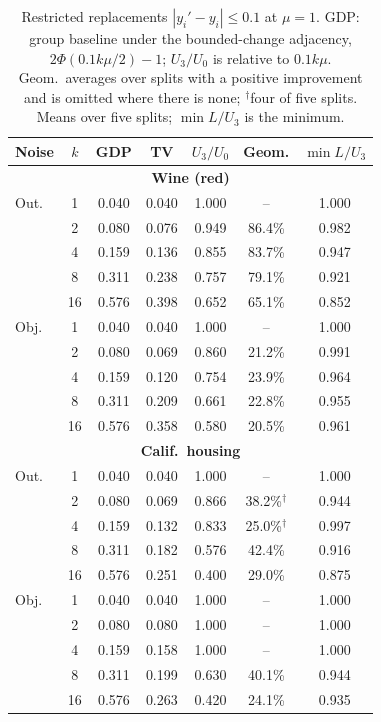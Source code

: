 \begin{table}[t]
\centering
\caption{Restricted replacements $|y_i'-y_i|\le0.1$ at $\mu=1$. GDP: group baseline under the bounded-change adjacency, $2\Phi(0.1k\mu/2)-1$; $U_3/U_0$ is relative to $0.1k\mu$. Geom.\ averages over splits with a positive improvement and is omitted where there is none; $^\dagger$four of five splits. Means over five splits; $\min L/U_3$ is the minimum.}
\label{tab:restricted}
\footnotesize
\setlength{\tabcolsep}{4pt}
\begin{tabular}{lcccccc}
\toprule
Noise & $k$ & GDP & TV & $U_3/U_0$ & Geom. & $\min L/U_3$ \\
\midrule
\multicolumn{7}{c}{\textbf{Wine (red)}} \\
\midrule
Out. & 1 & 0.040 & 0.040 & 1.000 & -- & 1.000 \\
     & 2 & 0.080 & 0.076 & 0.949 & 86.4\% & 0.982 \\
     & 4 & 0.159 & 0.136 & 0.855 & 83.7\% & 0.947 \\
     & 8 & 0.311 & 0.238 & 0.757 & 79.1\% & 0.921 \\
     & 16 & 0.576 & 0.398 & 0.652 & 65.1\% & 0.852 \\
\addlinespace
Obj. & 1 & 0.040 & 0.040 & 1.000 & -- & 1.000 \\
     & 2 & 0.080 & 0.069 & 0.860 & 21.2\% & 0.991 \\
     & 4 & 0.159 & 0.120 & 0.754 & 23.9\% & 0.964 \\
     & 8 & 0.311 & 0.209 & 0.661 & 22.8\% & 0.955 \\
     & 16 & 0.576 & 0.358 & 0.580 & 20.5\% & 0.961 \\
\midrule
\multicolumn{7}{c}{\textbf{Calif.\ housing}} \\
\midrule
Out. & 1 & 0.040 & 0.040 & 1.000 & -- & 1.000 \\
     & 2 & 0.080 & 0.069 & 0.866 & 38.2\%$^\dagger$ & 0.944 \\
     & 4 & 0.159 & 0.132 & 0.833 & 25.0\%$^\dagger$ & 0.997 \\
     & 8 & 0.311 & 0.182 & 0.576 & 42.4\% & 0.916 \\
     & 16 & 0.576 & 0.251 & 0.400 & 29.0\% & 0.875 \\
\addlinespace
Obj. & 1 & 0.040 & 0.040 & 1.000 & -- & 1.000 \\
     & 2 & 0.080 & 0.080 & 1.000 & -- & 1.000 \\
     & 4 & 0.159 & 0.158 & 1.000 & -- & 1.000 \\
     & 8 & 0.311 & 0.199 & 0.630 & 40.1\% & 0.944 \\
     & 16 & 0.576 & 0.263 & 0.420 & 24.1\% & 0.935 \\
\bottomrule
\end{tabular}
\end{table}
